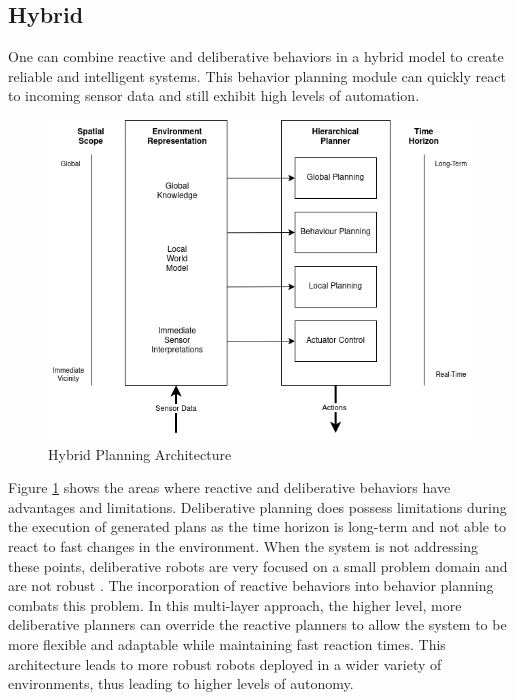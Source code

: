 \subsection{Hybrid}
One can combine reactive and deliberative behaviors in a hybrid model to create reliable and intelligent systems. This behavior planning module can quickly react to incoming sensor data and still exhibit high levels of automation. 

\begin{figure}[ht]
	\includegraphics[width=1.0\textwidth]{images/Deliberative_hierarchical_planning.png} 
	\caption{Hybrid Planning Architecture \cite{arkin1998}}
	\label{fig:hybrid_planning}
\end{figure}

Figure \ref{fig:hybrid_planning} shows the areas where reactive and deliberative behaviors have advantages and limitations. Deliberative planning does possess limitations during the execution of generated plans as the time horizon is long-term and not able to react to fast changes in the environment. When the system is not addressing these points, deliberative robots are very focused on a small problem domain and are not robust \cite{arkin1998}.
The incorporation of reactive behaviors into behavior planning combats this problem. In this multi-layer approach, the higher level, more deliberative planners can override the reactive planners to allow the system to be more flexible and adaptable while maintaining fast reaction times. 
This architecture leads to more robust robots deployed in a wider variety of environments, thus leading to higher levels of autonomy.


